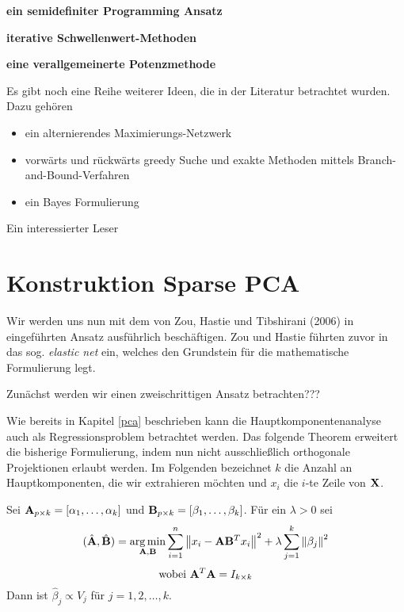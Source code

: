 \textbf{ein semidefiniter Programming Ansatz}

\textbf{iterative Schwellenwert-Methoden}

\textbf{eine verallgemeinerte Potenzmethode}

Es gibt noch eine Reihe weiterer Ideen, die in der Literatur betrachtet wurden. Dazu gehören
\begin{itemize}
\item ein alternierendes Maximierungs-Netzwerk \cite{richtarik}
\item vorwärts und rückwärts greedy Suche und exakte Methoden mittels Branch-and-Bound-Verfahren \cite{moghaddam}
\item ein Bayes Formulierung \cite{guan}
\end{itemize}

Ein interessierter Leser 




\section{Konstruktion Sparse PCA}
\label{construction}

Wir werden uns nun mit dem von Zou, Hastie und Tibshirani (2006) in \cite{zou_sparsepca} eingeführten Ansatz ausführlich beschäftigen. Zou und Hastie führten zuvor in \cite{zou_elasticnet} das sog. \textit{elastic net} ein, welches den Grundstein für die mathematische Formulierung legt.

Zunächst werden wir einen zweischrittigen Ansatz betrachten???

Wie bereits in Kapitel \ref{pca} beschrieben kann die Hauptkomponentenanalyse auch als Regressionsproblem betrachtet werden. Das folgende Theorem erweitert die bisherige Formulierung, indem nun nicht ausschließlich orthogonale Projektionen erlaubt werden. 
Im Folgenden bezeichnet $k$ die Anzahl an Hauptkomponenten, die wir extrahieren möchten und $x_i$ die $i$-te Zeile von $\mathbf{X}$.

\begin{thm} \label{pca_regression_formulation_ridge}
Sei $\mathbf{A}_{p \times k} = [ \alpha_1, \ldots ,\alpha_k ]$ und $\mathbf{B}_{p \times k} = [ \beta_1, \ldots ,\beta_k ]$. Für ein $\lambda > 0$ sei
$$(\hat{\mathbf{A}}, \hat{\mathbf{B}}) = \operatorname*{arg\,min}_{\mathbf{A}, \mathbf{B}} \sum_{i=1}^{n} \left\lVert x_i - \mathbf{A}\mathbf{B}^Tx_i \right\rVert^2 + \lambda \sum_{j=1}^{k}\left\lVert \beta_j \right\rVert^2$$
$$\text{wobei } \mathbf{A}^T\mathbf{A} = I_{k \times k}$$
Dann ist $\hat{\beta}_j \propto V_j$ für $j = 1,2,\ldots,k$. 
\end{thm}

